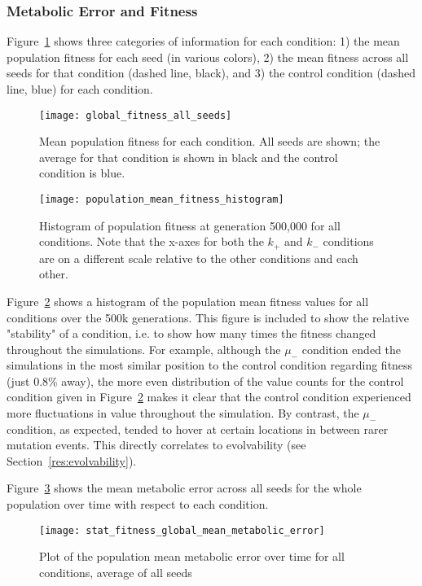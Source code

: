 \subsubsection{Metabolic Error and Fitness}\label{res:metabolic_error_and_fitness}
Figure~\ref{fig:mean_fitness_all_seeds} shows three categories of information for each condition: 1) the mean population fitness for each seed (in various colors), 2) the mean fitness across all seeds for that condition (dashed line, black), and 3) the control condition (dashed line, blue) for each condition.   

\begin{figure}[H]
	\texttt{[image: global\_fitness\_all\_seeds]}
	\caption[Fitness all seeds all conditions]{Mean population fitness for each condition. All seeds are shown; the average for that condition is shown in black and the control condition is blue.}
	\label{fig:mean_fitness_all_seeds}
\end{figure}

\begin{figure}[H]
	\texttt{[image: population\_mean\_fitness\_histogram]}
	\caption[Mean fitness histogram]{Histogram of population fitness at generation 500,000 for all conditions. Note that the x-axes for both the $k_+$ and $k_-$ conditions are on a different scale relative to the other conditions and each other.}
	\label{fig:global_fitness_histogram}
\end{figure}
Figure~\ref{fig:global_fitness_histogram} shows a histogram of the population mean fitness values for all conditions over the 500k generations. This figure is included to show the relative "stability" of a condition, i.e. to show how many times the fitness changed throughout the simulations. For example, although the $\mu_-$ condition ended the simulations in the most similar position to the control condition regarding fitness (just 0.8\% away), the more even distribution of the value counts for the control condition given in Figure~\ref{fig:global_fitness_histogram} makes it clear that the control condition experienced more fluctuations in value throughout the simulation. By contrast, the $\mu_-$ condition, as expected, tended to hover at certain locations in between rarer mutation events. This directly correlates to evolvability (see Section~\ref{res:evolvability}). 

Figure~\ref{fig:mean_metabolic_error} shows the mean metabolic error across all seeds for the whole population over time with respect to each condition. 
\begin{figure}[H]
	\texttt{[image: stat\_fitness\_global\_mean\_metabolic\_error]}
	\caption[Metabolic error]{Plot of the population mean metabolic error over time for all conditions, average of all seeds}
	\label{fig:mean_metabolic_error}
\end{figure}

